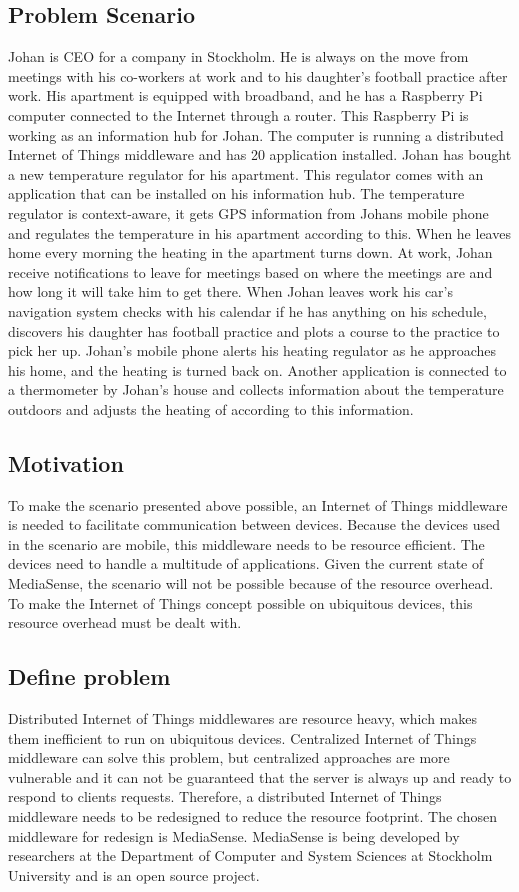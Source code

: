 \subsection{Problem Scenario}
Johan is CEO for a company in Stockholm. He is always on the move from meetings with his co-workers at work and to his daughter's football practice after work. His apartment is equipped with broadband, and he has a Raspberry Pi computer connected to the Internet through a router. This Raspberry Pi is working as an information hub for Johan. The computer is running a distributed Internet of Things middleware and has 20 application installed. Johan has bought a new temperature regulator for his apartment. This regulator comes with an application that can be installed on his information hub. The temperature regulator is context-aware, it gets GPS information from Johans mobile phone and regulates the temperature in his apartment according to this. When he leaves home every morning the heating in the apartment turns down. At work, Johan receive notifications to leave for meetings based on where the meetings are and how long it will take him to get there. When Johan leaves work his car's navigation system checks with his calendar if he has anything on his schedule, discovers his daughter has football practice and plots a course to the practice to pick her up. Johan's mobile phone alerts his heating regulator as he approaches his home, and the heating is turned back on. Another application is connected to a thermometer by Johan's house and collects information about the temperature outdoors and adjusts the heating of according to this information.

\subsection{Motivation}
To make the scenario presented above possible, an Internet of Things middleware is needed to facilitate communication between devices. Because the devices used in the scenario are mobile, this middleware needs to be resource efficient. The devices need to handle a multitude of applications. Given the current state of MediaSense, the scenario will not be possible because of the resource overhead. To make the Internet of Things concept possible on ubiquitous devices, this resource overhead must be dealt with.

\subsection{Define problem}
Distributed Internet of Things middlewares are resource heavy, which makes them inefficient to run on ubiquitous devices. Centralized Internet of Things middleware can solve this problem, but centralized approaches are more vulnerable and it can not be guaranteed that the server is always up and ready to respond to clients requests. Therefore, a distributed Internet of Things middleware needs to be redesigned to reduce the resource footprint. The chosen middleware for redesign is MediaSense. MediaSense is being developed by researchers at the Department of Computer and System Sciences at Stockholm University and is an open source project. 

